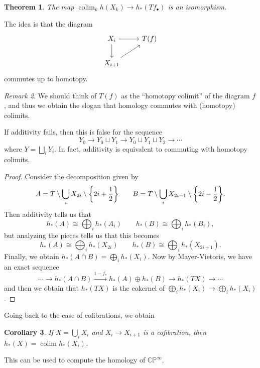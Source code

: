\documentclass[leqno, openany]{memoir}
\newtheorem{thm}{Theorem}[section]
\newtheorem{cor}[thm]{Corollary}
\theoremstyle{definition}
\theoremstyle{remark}
\newtheorem{rmk}[thm]{Remark}
\theoremstyle{plain}
\theoremstyle{definition}
\theoremstyle{remark}
\newcommand{\C}{\mathbb{C}}
\renewcommand{\P}{\mathbb{P}}
\DeclareMathOperator{\colim}{colim}
\begin{document}
\begin{thm}
    The map $\colim_k h(X_k) \to h_*(Tf_{\bullet})$ is an isomorphism.
\end{thm}

The idea is that the diagram
\begin{equation*}
\begin{tikzcd}
    X_i \arrow{d} \arrow{r} & T(f) \\
    X_{i+1} \arrow{ur}
\end{tikzcd}
\end{equation*}
commutes up to homotopy. 

\begin{rmk}
    We should think of $T(f)$ as the ``homotopy colimit'' of the diagram $f$, and thus we obtain the slogan that homology commutes with (homotopy) colimits.
\end{rmk}

If additivity fails, then this is false for the sequence
\[ Y_0 \to Y_0 \sqcup Y_1 \to Y_0 \sqcup Y_1 \sqcup Y_2 \to \cdots \]
where $Y = \bigsqcup_i Y_i$. In fact, additivity is equivalent to commuting with homotopy colimits.

\begin{proof}
    Consider the decomposition given by
    \[ A = T \setminus \bigcup_i X_{2i} \setminus \qty{2i + \frac{1}{2}} \qquad B = T \setminus \bigcup_i X_{2i-1} \setminus \qty{2i - \frac{1}{2}}. \]
    Then additivity tells us that
    \[ h_*(A) \cong \bigoplus_i h_*(A_i) \qquad h_*(B) \cong \bigoplus_i h_*(B_i), \]
    but analyzing the pieces tells us that this becomes
    \[ h_*(A) \cong \bigoplus_i h_*(X_{2i}) \qquad h_*(B) \cong \bigoplus_i h_*(X_{2i+1}). \]
    Finally, we obtain $h_*(A \cap B) = \bigoplus_i h_*(X_i)$. Now by Mayer-Vietoris, we have an exact sequence
    \[ \cdots \to h_*(A \cap B) \xrightarrow{1-f_*} h_*(A) \oplus h_*(B) \to h_*(TX) \to \cdots \]
    and then we obtain that $h_*(TX)$ is the cokernel of $\bigoplus_i h_*(X_i) \to \bigoplus_i h_*(X_i)$.
\end{proof}

Going back to the case of cofibrations, we obtain
\begin{cor}
    If $X = \bigcup_i X_i$ and $X_i \to X_{i+1}$ is a cofibration, then $h_*(X) = \colim h_*(X_i)$.
\end{cor}

This can be used to compute the homology of $\C\P^{\infty}$.
\end{document}
